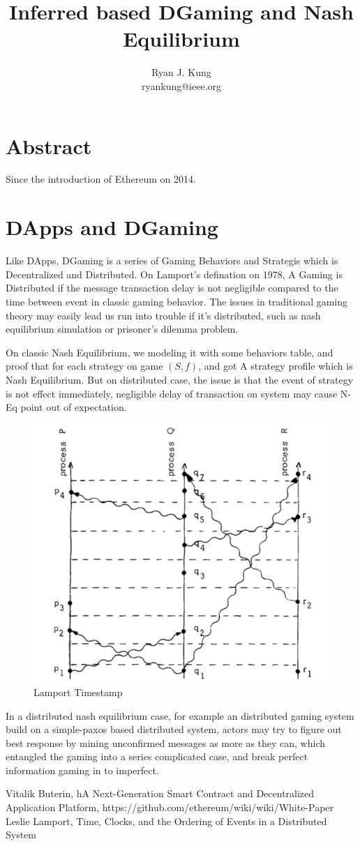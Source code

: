 \documentclass{article}
\author{Ryan J. Kung \\ryankung@ieee.org}
\title{Inferred based DGaming and Nash Equilibrium}
\begin{document}
\maketitle
\tableofcontents
\section{Abstract}

Since the introduction of Ethereum on 2014\cite{ethereum}.

\section{DApps and DGaming}

Like DApps, DGaming is a series of Gaming Behaviors and Strategis which is Decentralized and Distributed. On Lamport's defination on 1978\cite{lamport}, A Gaming is Distributed if the message transaction delay is not negligible compared to the time between event in classic gaming behavior. The issues in traditional gaming theory may easily lead us run into trouble if it's distributed, such as nash equilibrium simulation or prisoner's dilemma problem.

On classic Nash Equilibrium, we modeling it with some behaviors table, and proof that for each strategy on game $(S, f)$, and got A strategy profile which is Nash Equilibrium. But on distributed case, the issue is that the event of strategy is not effect immediately, negligible delay of transaction on system may cause N-Eq point out of expectation.
\begin{figure}
  \centering
  \includegraphics[width=0.5\linewidth]{img/lamportts.png}
  \caption{Lamport Timestamp}
\end{figure}

In a distributed nash equilibrium case, for example an distributed gaming system build on a simple-paxos based distributed system, actors may try to figure out best response by mining unconfirmed messages as more as they can, which entangled the gaming into a series complicated case, and break perfect information gaming in to imperfect.
\begin{thebibliography}{9}
 Vitalik Buterin, hA Next-Generation Smart Contract and Decentralized Application Platform, https://github.com/ethereum/wiki/wiki/White-Paper
 Leslie Lamport, Time, Clocks, and the Ordering of Events in a Distributed System
\end{thebibliography}
\end{document}
